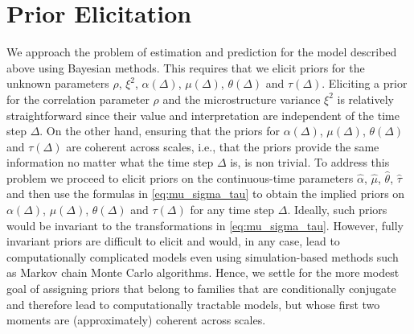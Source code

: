 \section{Prior Elicitation}\label{se:prior_elicitation}

We approach the problem of estimation and prediction for the model described above using Bayesian methods. This requires that we elicit priors for the unknown parameters $\rho$, $\xi^2$, $\alpha(\Delta)$, $\mu(\Delta)$, $\theta(\Delta)$ and $\tau(\Delta)$.  Eliciting a prior for the correlation parameter $\rho$ and the microstructure variance $\xi^2$ is relatively straightforward since their value and interpretation are independent of the time step $\Delta$.  On the other hand, ensuring that the priors for $\alpha(\Delta)$, $\mu(\Delta)$, $\theta(\Delta)$ and $\tau(\Delta)$ are coherent across scales, i.e., that the priors provide the same information no matter what the time step $\Delta$ is, is non trivial.  To address this problem we proceed to elicit priors on the continuous-time parameters $\hat{\alpha}$, $\hat{\mu}$, $\hat{\theta}$, $\hat{\tau}$ and then use the formulas in \eqref{eq:mu_sigma_tau} to obtain the implied priors on $\alpha(\Delta)$, $\mu(\Delta)$, $\theta(\Delta)$ and $\tau(\Delta)$ for any time step $\Delta$.  Ideally, such priors would be invariant to the transformations in \eqref{eq:mu_sigma_tau}.  However, fully invariant priors are difficult to elicit and would, in any case, lead to computationally complicated models even using simulation-based methods such as Markov chain Monte Carlo algorithms.  Hence, we settle for the more modest goal of assigning priors that belong to families that are conditionally conjugate and therefore lead to computationally tractable models, but whose first two moments are (approximately) coherent across scales.


